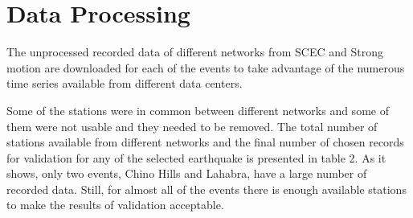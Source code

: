 
\section{Data Processing}

The unprocessed recorded data of different networks from SCEC and Strong motion are downloaded for each of the events to take advantage of the numerous time series available from different data centers.

Some of the stations were in common between different networks and some of them were not usable and they needed to be removed. 
The total number of stations available from different networks and the final number of chosen records  for validation for any of the selected earthquake is presented in table 2.  
As it shows, only two events, Chino Hills and Lahabra, have a large number of recorded data. Still, for almost all of the events there is enough  available stations to make the results of validation acceptable. 

